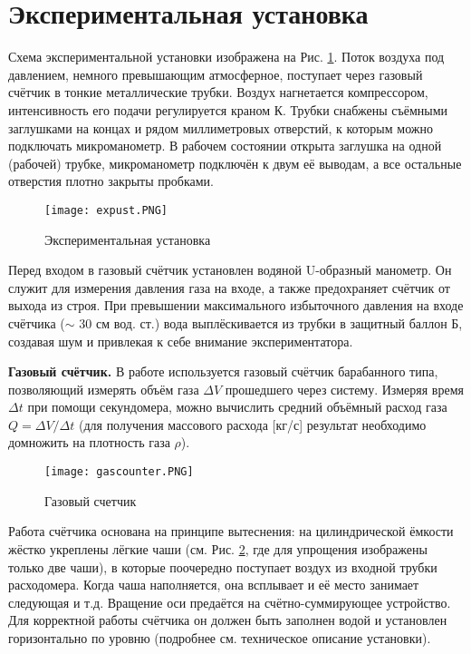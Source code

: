 \documentclass[a4paper,12pt]{article} %
\begin{document}
\section{Экспериментальная установка}

Схема экспериментальной установки изображена на Рис. \ref{233}. Поток воздуха
под давлением, немного превышающим атмосферное, поступает через газовый счётчик в тонкие металлические трубки. Воздух нагнетается компрессором, интенсивность его подачи регулируется краном К. Трубки снабжены
съёмными заглушками на концах и рядом миллиметровых отверстий, к которым можно подключать микроманометр. В рабочем состоянии открыта заглушка на одной (рабочей) трубке, микроманометр подключён к двум её выводам, а все остальные отверстия плотно закрыты пробками.

\begin{figure}[H]
    \centering
    \texttt{[image: expust.PNG]}
    \caption{Экспериментальная установка}
    \label{233}
\end{figure}

Перед входом в газовый счётчик установлен водяной U-образный манометр. Он служит для измерения давления газа на входе, а также предохраняет
счётчик от выхода из строя. При превышении максимального избыточного
давления на входе счётчика ($\sim$ 30 см вод. ст.) вода выплёскивается из трубки
в защитный баллон Б, создавая шум и привлекая к себе внимание экспериментатора.


\textbf{Газовый счётчик.} В работе используется газовый счётчик барабанного
типа, позволяющий измерять объём газа $\Delta V$ прошедшего через систему. Измеряя время $\Delta t$ при помощи секундомера, можно вычислить средний объёмный расход газа $Q = \Delta V/ \Delta t$ (для получения массового расхода [кг/с] результат
необходимо домножить на плотность газа $\rho$).

\begin{figure}[H]
    \centering
    \texttt{[image: gascounter.PNG]}
    \caption{Газовый счетчик}
    \label{333}
\end{figure}


Работа счётчика основана на принципе вытеснения: на цилиндрической ёмкости жёстко
укреплены лёгкие чаши (см. Рис. \ref{333}, где для
упрощения изображены только две чаши), в которые поочередно поступает воздух из входной
трубки расходомера. Когда чаша наполняется,
она всплывает и её место занимает следующая
и т.д. Вращение оси предаётся на счётно-суммирующее устройство.
Для корректной работы счётчика он должен
быть заполнен водой и установлен горизонтально по уровню (подробнее см. техническое
описание установки).
\end{document}
